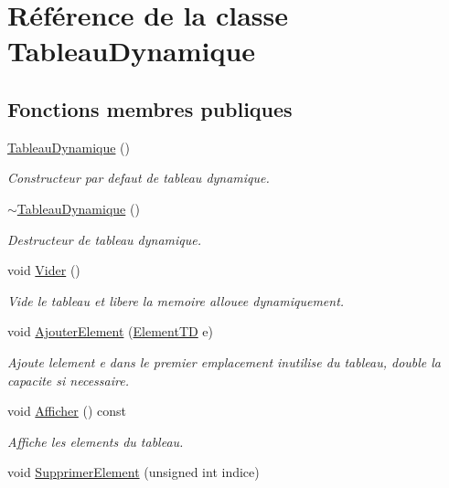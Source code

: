 \hypertarget{classTableauDynamique}{}\section{Référence de la classe Tableau\+Dynamique}
\label{classTableauDynamique}
\subsection*{Fonctions membres publiques}
\begin{DoxyCompactItemize}
\item 
\hyperlink{classTableauDynamique_a9b1371952458a1b1b528dda5eff3cab4}{Tableau\+Dynamique} ()
\begin{DoxyCompactList}\small\item\em Constructeur par defaut de tableau dynamique. \end{DoxyCompactList}\item 
\hyperlink{classTableauDynamique_a0aa7eed220cb6a78eb6ea661df42867b}{$\sim$\+Tableau\+Dynamique} ()
\begin{DoxyCompactList}\small\item\em Destructeur de tableau dynamique. \end{DoxyCompactList}\item 
void \hyperlink{classTableauDynamique_a4acb54651eb6b46fcdb63ec1ea37b53a}{Vider} ()
\begin{DoxyCompactList}\small\item\em Vide le tableau et libere la memoire allouee dynamiquement. \end{DoxyCompactList}\item 
void \hyperlink{classTableauDynamique_a5ebbd8c6181121f2ca2d19986a5bd646}{Ajouter\+Element} (\hyperlink{classUnite}{Element\+TD} e)
\begin{DoxyCompactList}\small\item\em Ajoute l\textquotesingle{}element e dans le premier emplacement inutilise du tableau, double la capacite si necessaire. \end{DoxyCompactList}\item 
void \hyperlink{classTableauDynamique_ae1cd223289dc0ab3c8a388c7da7b5ca5}{Afficher} () const
\begin{DoxyCompactList}\small\item\em Affiche les elements du tableau. \end{DoxyCompactList}\item 
void \hyperlink{classTableauDynamique_a382e579005b5175e858fd2b2390b1fa1}{Supprimer\+Element} (unsigned int indice)

\end{DoxyCompactItemize}
